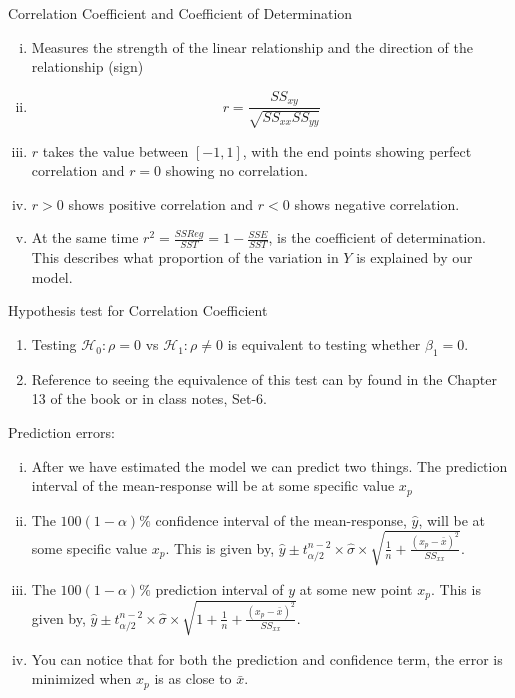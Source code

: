 \documentclass{beamer}
\begin{document}
	\begin{frame}{Correlation Coefficient and Coefficient of Determination}
		\begin{enumerate}[i)]
			\item Measures the strength of the linear relationship and the direction of the relationship (sign)
			\item $$r = \frac{SS_{xy}}{\sqrt{SS_{xx}SS_{yy}}}$$
			\item $r$ takes the value between $[-1,1]$, with the end points showing perfect correlation and $r=0$ showing no correlation.
			\item $r>0$ shows positive correlation and $r<0$ shows negative correlation.
			\item At the same time $r^2=\frac{SSReg}{SST}=1-\frac{SSE}{SST}$, is the coefficient of determination. This describes what proportion of the variation in $Y$ is explained by our model. 
		\end{enumerate}
	\end{frame}
	\begin{frame}{Hypothesis test for Correlation Coefficient}
		\begin{enumerate}
			\item Testing $\mathcal{H}_0: \rho = 0$ vs $\mathcal{H}_1: \rho \neq 0$ is equivalent to testing whether $\beta_1=0$.
			\item Reference to seeing the equivalence of this test can by found in the Chapter 13 of the book or in class notes, Set-6.
		\end{enumerate}
	\end{frame}
	\begin{frame}{Prediction errors:}
		\begin{enumerate}[i)]
			\item After we have estimated the model we can predict two things. The prediction interval of the mean-response will be at some specific value $x_p$ 
			\item The $100(1-\alpha)\%$ confidence interval of the mean-response, $\hat{y}$, will be at some specific value $x_p$. This is given by, $\hat{y}\pm t^{n-2}_{\alpha/2}\times\hat{\sigma}\times\sqrt{\frac{1}{n}+\frac{(x_p-\bar{x})^2}{SS_{xx}}}$.
			\item The $100(1-\alpha)\%$ prediction interval of $y$ at some new point $x_p$. This is given by, $\hat{y}\pm t^{n-2}_{\alpha/2}\times\hat{\sigma}\times\sqrt{1+\frac{1}{n}+\frac{(x_p-\bar{x})^2}{SS_{xx}}}$.
			\item You can notice that for both the prediction and confidence term, the error is minimized when $x_p$ is as close to $\bar{x}$. 
		\end{enumerate}
	\end{frame}
\end{document}
